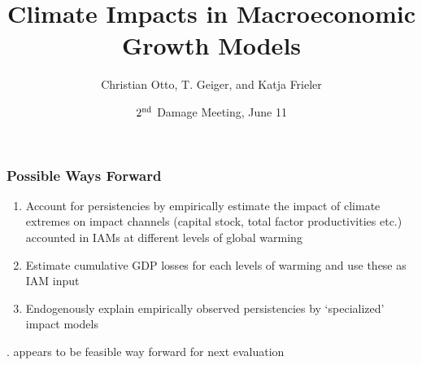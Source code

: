 \documentclass[
c,
11pt,
aspectratio=169, %
final,
]{beamer}
\author{Christian Otto, T. Geiger, and Katja Frieler}
\title{Climate Impacts in Macroeconomic Growth Models}
\date{$2^{\operatorname{nd}}$ Damage Meeting, June 11}
\begin{document}
\begin{frame}[plain]
  \maketitle
\end{frame}
\begin{frame}
  \frametitle{Possible Ways Forward}
  \begin{enumerate}
  \item Account for persistencies by empirically estimate the impact of climate extremes on impact channels (capital stock, total factor productivities etc.) accounted in IAMs at different levels of global warming
  \item Estimate cumulative GDP losses for each levels of warming and use these as IAM input
  \item Endogenously explain empirically observed persistencies by `specialized' impact models 
  \end{enumerate}
  \begin{itemize}
. appears to be feasible way forward for next evaluation
  \end{itemize}
\end{frame}
\end{document}

